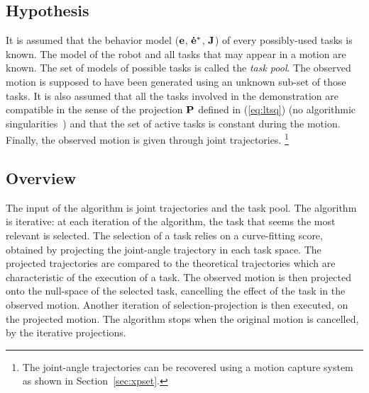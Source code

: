 \documentclass[letterpaper, 10pt, conference]{ieeeconf}      %
\begin{document}
\subsection{Hypothesis}
It is assumed that the behavior model (${\mathbf{e}}$, ${\mathbf{\dot{e}^*}}$, ${\mathbf{J}}$) of every
possibly-used tasks is known. The model of the robot and all tasks that may appear in a 
motion are known. The set of models of possible tasks is called the \emph{task pool}.
The observed motion is supposed to have been generated using an unknown sub-set of those tasks.  
It is also assumed that all the tasks involved in the demonstration are compatible
in the sense of the projection ${\mathbf{P}}$ defined in (\ref{eq:ltsq})
(no algorithmic singularities~\cite{chiaverini97}) and that the set
of active tasks is constant during the motion.
Finally, the observed motion is given through
joint trajectories. \footnote{The joint-angle trajectories can be recovered using a motion
capture system as shown in Section~\ref{sec:xpset}.}

\subsection{Overview}
\label{sec:alg1:selec}
The input of the algorithm is joint trajectories and
the task pool. The algorithm is iterative: at each iteration of the algorithm, the task that seems the
most relevant is selected. The selection of a task relies
on a curve-fitting score, obtained by projecting the joint-angle trajectory in each task space.
The projected trajectories are
compared to the theoretical trajectories which are characteristic
of the execution of a task.
The observed motion is then projected
onto the null-space of the selected task, cancelling the effect of the task in the observed motion.
Another iteration of selection-projection is then executed, on the projected motion.
The algorithm stops when the original motion is cancelled, by the iterative projections.
\newcommand{\shOUTPUT}{\textbf{Output: }}
\newcommand{\shINPUT}{\textbf{Input: }}
\end{document}
